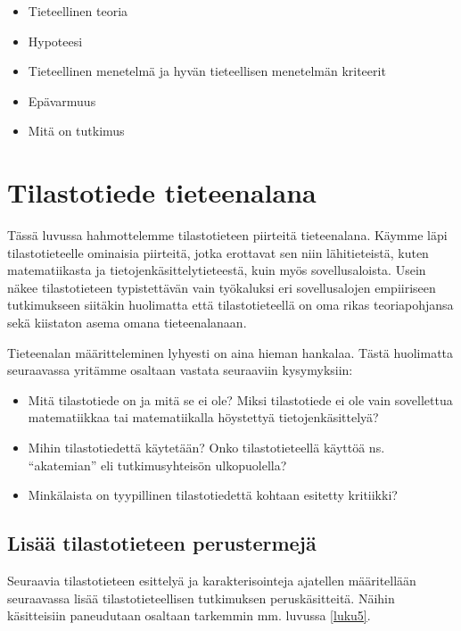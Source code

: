 \documentclass[
]{book}
\providecommand{\tightlist}{%
  \setlength{\itemsep}{0pt}\setlength{\parskip}{0pt}}
\begin{document}
\begin{itemize}
\tightlist
\item
  Tieteellinen teoria
\item
  Hypoteesi
\item
  Tieteellinen menetelmä ja hyvän tieteellisen menetelmän kriteerit
\item
  Epävarmuus
\item
  Mitä on tutkimus
\end{itemize}

\hypertarget{luku3}{%
\chapter{Tilastotiede tieteenalana}\label{luku3}}

Tässä luvussa hahmottelemme tilastotieteen piirteitä tieteenalana. Käymme läpi tilastotieteelle ominaisia piirteitä, jotka erottavat sen niin lähitieteistä, kuten matematiikasta ja tietojenkäsittelytieteestä, kuin myös sovellusaloista. Usein näkee tilastotieteen typistettävän vain työkaluksi eri sovellusalojen empiiriseen tutkimukseen siitäkin huolimatta että tilastotieteellä on oma rikas teoriapohjansa sekä kiistaton asema omana tieteenalanaan.

Tieteenalan määritteleminen lyhyesti on aina hieman hankalaa. Tästä huolimatta seuraavassa yritämme osaltaan vastata seuraaviin kysymyksiin:

\begin{itemize}
\tightlist
\item
  Mitä tilastotiede on ja mitä se ei ole? Miksi tilastotiede ei ole vain sovellettua matematiikkaa tai matematiikalla höystettyä tietojenkäsittelyä?
\item
  Mihin tilastotiedettä käytetään? Onko tilastotieteellä käyttöä ns. ``akatemian'' eli tutkimusyhteisön ulkopuolella?
\item
  Minkälaista on tyypillinen tilastotiedettä kohtaan esitetty kritiikki?
\end{itemize}

\hypertarget{alaluku31}{%
\section{Lisää tilastotieteen perustermejä}\label{alaluku31}}

Seuraavia tilastotieteen esittelyä ja karakterisointeja ajatellen määritellään seuraavassa lisää tilastotieteellisen tutkimuksen peruskäsitteitä. Näihin käsitteisiin paneudutaan osaltaan tarkemmin mm. luvussa \ref{luku5}.
\end{document}
